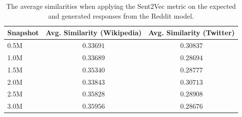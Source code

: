 \begin{table}[H]
	\centering
	\begin{adjustbox}{max width=\textwidth}
		\begin{tabular}{lcc}
			\toprule
			Snapshot & Avg. Similarity (Wikipedia) & Avg. Similarity (Twitter)\\
			\midrule
			0.5M & $0.33691$ & $0.30837$\\
			1.0M & $0.33689$ & $0.28694$\\
			1.5M & $0.35340$ & $0.28777$\\
			2.0M & $0.33843$ & $0.30713$\\
			2.5M & $0.35828$ & $0.28908$\\
			3.0M & $0.35956$ & $0.28676$\\
			\bottomrule
		\end{tabular}
	\end{adjustbox}
	\caption{The average similarities when applying the Sent2Vec metric on the expected and generated responses from the Reddit model.}
	\label{results:sent2vec:reddit:results_table}
\end{table}

